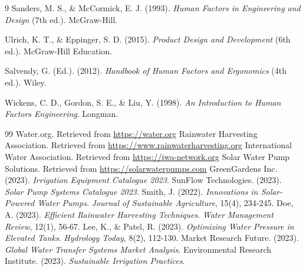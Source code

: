 \documentclass[12pt]{report}
\begin{document}
\begin{thebibliography}{9}
    Sanders, M. S., \& McCormick, E. J. (1993). \emph{Human Factors in Engineering and Design} (7th ed.). McGraw-Hill.
    
    Ulrich, K. T., \& Eppinger, S. D. (2015). \emph{Product Design and Development} (6th ed.). McGraw-Hill Education.
    
    Salvendy, G. (Ed.). (2012). \emph{Handbook of Human Factors and Ergonomics} (4th ed.). Wiley.
    
    Wickens, C. D., Gordon, S. E., \& Liu, Y. (1998). \emph{An Introduction to Human Factors Engineering}. Longman.

\end{thebibliography}


\renewcommand{\bibname}{Chapter 4 Bibliography}
\begin{thebibliography}{99}
     Water.org. Retrieved from \url{https://water.org}
     Rainwater Harvesting Association. Retrieved from \url{https://www.rainwaterharvesting.org}
     International Water Association. Retrieved from \url{https://iwa-network.org}
     Solar Water Pump Solutions. Retrieved from \url{https://solarwaterpumps.com}
     GreenGardens Inc. (2023). \textit{Irrigation Equipment Catalogue 2023}.
     SunFlow Technologies. (2023). \textit{Solar Pump Systems Catalogue 2023}.
     Smith, J. (2022). \textit{Innovations in Solar-Powered Water Pumps}. \textit{Journal of Sustainable Agriculture}, 15(4), 234-245.
     Doe, A. (2023). \textit{Efficient Rainwater Harvesting Techniques}. \textit{Water Management Review}, 12(1), 56-67.
     Lee, K., \& Patel, R. (2023). \textit{Optimizing Water Pressure in Elevated Tanks}. \textit{Hydrology Today}, 8(2), 112-130.
     Market Research Future. (2023). \textit{Global Water Transfer Systems Market Analysis}.
     Environmental Research Institute. (2023). \textit{Sustainable Irrigation Practices}.
\end{thebibliography}
\end{document}
